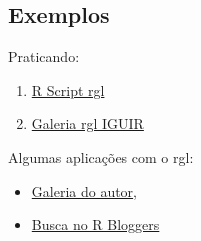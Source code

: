 
\subsection{Exemplos}

\begin{frame}

  Praticando:
  \begin{enumerate}
  \item \href{run:./R/rgl/rgl.R}{R Script rgl}
  \item \href{run:./rgl/RGL.html}{Galeria rgl IGUIR}
  \end{enumerate}

  Algumas aplicações com o rgl:
  \begin{itemize}
    \itemsep1pt\parskip0pt
  \item
    \href{http://cran.r-project.org/web/packages/rgl/vignettes/}{Galeria
      do autor},
  \item \href{http://www.r-bloggers.com/?s=rgl}{Busca no R Bloggers}
  \end{itemize}

\end{frame}
